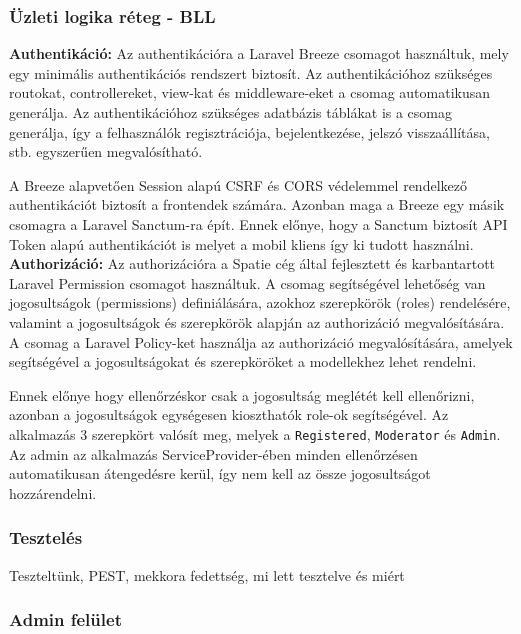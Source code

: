 \subsubsection{Üzleti logika réteg - BLL}


\textbf{Authentikáció:} Az authentikációra a Laravel Breeze csomagot használtuk, mely egy minimális authentikációs rendszert biztosít. Az authentikációhoz szükséges routokat, controllereket, view-kat és middleware-eket a csomag automatikusan generálja. Az authentikációhoz szükséges adatbázis táblákat is a csomag generálja, így a felhasználók regisztrációja, bejelentkezése, jelszó visszaállítása, stb. egyszerűen megvalósítható.

A Breeze alapvetően Session alapú CSRF és CORS védelemmel rendelkező authentikációt biztosít a frontendek számára. Azonban maga a Breeze egy másik csomagra a Laravel Sanctum-ra épít. Ennek előnye, hogy a Sanctum biztosít API Token alapú authentikációt is melyet a mobil kliens így ki tudott használni.\\

\textbf{Authorizáció:} Az authorizációra a Spatie cég által fejlesztett és karbantartott Laravel Permission csomagot használtuk. A csomag segítségével lehetőség van jogosultságok (permissions) definiálására, azokhoz szerepkörök (roles) rendelésére, valamint a jogosultságok és szerepkörök alapján az authorizáció megvalósítására. A csomag a Laravel Policy-ket használja az authorizáció megvalósítására, amelyek segítségével a jogosultságokat és szerepköröket a modellekhez lehet rendelni.

Ennek előnye hogy ellenőrzéskor csak a jogosultság meglétét kell ellenőrizni, azonban a jogosultságok egységesen kioszthatók role-ok segítségével. Az alkalmazás 3 szerepkört valósít meg, melyek a \texttt{Registered}, \texttt{Moderator} és \texttt{Admin}. Az admin az alkalmazás ServiceProvider-ében minden ellenőrzésen automatikusan átengedésre kerül, így nem kell az össze jogosultságot hozzárendelni.\\

\subsubsection{Tesztelés}

Teszteltünk, PEST, mekkora fedettség, mi lett tesztelve és miért

\subsubsection{Admin felület}

